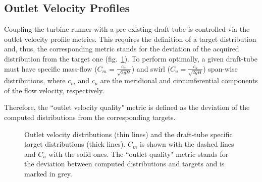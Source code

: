 \subsection{Outlet Velocity Profiles}
Coupling the turbine runner with a pre-existing draft-tube is controlled via the outlet velocity profile metrics. This requires the definition of a target distribution and, thus, the corresponding metric stands for the deviation of the acquired distribution from the target one (fig.\ \ref{design-obj2}). To perform optimally, a given draft-tube must have specific mass-flow ($C_m=\frac{c_m}{\sqrt{2gH}}$) and  swirl ($C_u=\frac{c_u}{\sqrt{2gH}}$) span-wise distributions, where $c_m$ and $c_u$ are the meridional and circumferential components of the flow velocity, respectively.


Therefore, the  ``outlet velocity quality" metric is defined as the deviation of the computed distributions from the corresponding targets. 

\begin{figure}[h!]
\begin{minipage}[b]{1\linewidth}
 \centering
\end{minipage}
\caption{Outlet velocity distributions (thin lines) and the draft-tube specific target distributions (thick lines). $C_m$ is shown with the dashed lines and $C_u$ with the solid ones. The ``outlet quality" metric stands for the deviation between computed distributions and  targets and is marked in grey.}
\label{design-obj2}
\end{figure}

